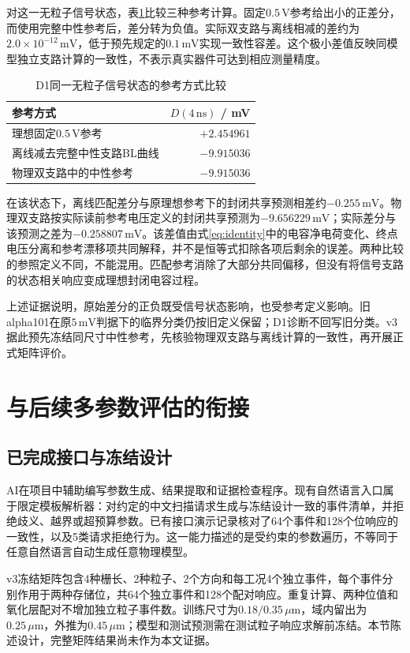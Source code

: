 \documentclass[UTF8,a4paper,zihao=-4,fontset=fandol]{ctexart}
\newcommand{\um}{\,\mu\mathrm{m}}
\newcommand{\ns}{\,\mathrm{ns}}
\newcommand{\mV}{\,\mathrm{mV}}
\newcommand{\V}{\,\mathrm{V}}
\begin{document}
对这一无粒子信号状态，表\ref{tab:reference}比较三种参考计算。固定$0.5\V$参考给出小的正差分，而使用完整中性参考后，差分转为负值。实际双支路与离线相减的差约为$2.0\times10^{-12}\mV$，低于预先规定的$0.1\mV$实现一致性容差。这个极小差值反映同模型独立支路计算的一致性，不表示真实器件可达到相应测量精度。

\begin{table}[htbp]
\centering\small
\caption{D1同一无粒子信号状态的参考方式比较}
\label{tab:reference}
\begin{tabularx}{0.94\textwidth}{@{}Xr@{}}
\toprule
参考方式 & $D(4\ns)$ / mV\\
\midrule
理想固定$0.5\V$参考 & $+2.454961$\\
离线减去完整中性支路BL曲线 & $-9.915036$\\
物理双支路中的中性参考 & $-9.915036$\\
\bottomrule
\end{tabularx}
\end{table}

在该状态下，离线匹配差分与原理想参考下的封闭共享预测相差约$-0.255\mV$。物理双支路按实际读前参考电压定义的封闭共享预测为$-9.656229\mV$；实际差分与该预测之差为$-0.258807\mV$。该差值由式\eqref{eq:identity}中的电容净电荷变化、终点电压分离和参考漂移项共同解释，并不是恒等式扣除各项后剩余的误差。两种比较的参照定义不同，不能混用。匹配参考消除了大部分共同偏移，但没有将信号支路的状态相关响应变成理想封闭电容过程。

上述证据说明，原始差分的正负既受信号状态影响，也受参考定义影响。旧alpha101在原$5\mV$判据下的临界分类仍按旧定义保留；D1诊断不回写旧分类。v3据此预先冻结同尺寸中性参考，先核验物理双支路与离线计算的一致性，再开展正式矩阵评价。

\section{与后续多参数评估的衔接}
\subsection{已完成接口与冻结设计}
AI在项目中辅助编写参数生成、结果提取和证据检查程序。现有自然语言入口属于限定模板解析器：对约定的中文扫描请求生成与冻结设计一致的事件清单，并拒绝歧义、越界或超预算参数。已有接口演示记录核对了64个事件和128个位响应的一致性，以及5类请求拒绝行为\cite{v3demo}。这一能力描述的是受约束的参数遍历，不等同于任意自然语言自动生成任意物理模型。

v3冻结矩阵包含4种栅长、2种粒子、2个方向和每工况4个独立事件，每个事件分别作用于两种存储位，共64个独立事件和128个配对响应。重复计算、两种位值和氧化层配对不增加独立粒子事件数。训练尺寸为$0.18/0.35\um$，域内留出为$0.25\um$，外推为$0.45\um$；模型和测试预测需在测试粒子响应求解前冻结\cite{v3design}。本节陈述设计，完整矩阵结果尚未作为本文证据。
\end{document}
